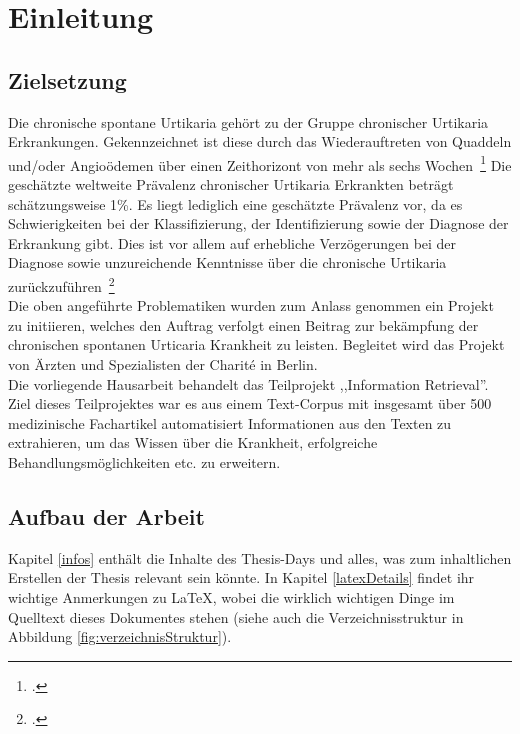 \section{Einleitung}

\subsection{Zielsetzung}

Die chronische spontane Urtikaria gehört zu der Gruppe chronischer Urtikaria Erkrankungen. Gekennzeichnet ist diese
durch das Wiederauftreten von Quaddeln und/oder Angioödemen über einen Zeithorizont von mehr als sechs
Wochen~\footcite[\vglf][]{savic.2020}
Die geschätzte weltweite Prävalenz chronischer Urtikaria Erkrankten beträgt schätzungsweise 1\%. Es liegt lediglich eine
geschätzte Prävalenz vor, da es Schwierigkeiten bei der Klassifizierung, der Identifizierung sowie der Diagnose der
Erkrankung gibt. Dies ist vor allem auf erhebliche Verzögerungen bei der Diagnose sowie unzureichende Kenntnisse über
die chronische Urtikaria zurückzuführen~\footcite[\vglf][]{savic.2020}\\

Die oben angeführte Problematiken wurden zum Anlass genommen ein Projekt zu initiieren, welches den Auftrag verfolgt
einen Beitrag zur bekämpfung der chronischen spontanen Urticaria Krankheit zu leisten. Begleitet wird das Projekt von
Ärzten und Spezialisten der Charité in Berlin.\\

Die vorliegende Hausarbeit behandelt das Teilprojekt ,,Information Retrieval''. Ziel dieses Teilprojektes war es aus einem
Text-Corpus mit insgesamt über 500 medizinische Fachartikel automatisiert Informationen aus den Texten zu extrahieren,
um das Wissen über die Krankheit, erfolgreiche Behandlungsmöglichkeiten etc. zu erweitern.\\

\subsection{Aufbau der Arbeit}

Kapitel \ref{infos} enthält die Inhalte des Thesis-Days und alles, was zum inhaltlichen Erstellen der Thesis relevant sein könnte.
In Kapitel \ref{latexDetails}  findet ihr wichtige Anmerkungen zu \LaTeX{}, wobei die wirklich wichtigen Dinge im Quelltext dieses Dokumentes stehen (siehe auch die Verzeichnisstruktur in Abbildung \ref{fig:verzeichnisStruktur}).

